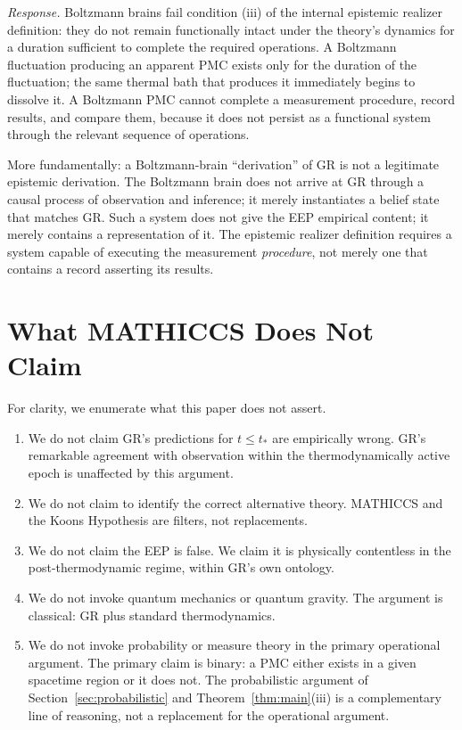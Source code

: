 \documentclass[11pt,a4paper]{article}
\begin{document}
\emph{Response.} Boltzmann brains fail condition (iii) of the internal epistemic
realizer definition: they do not remain functionally intact under the theory's dynamics
for a duration sufficient to complete the required operations. A Boltzmann fluctuation
producing an apparent PMC exists only for the duration of the fluctuation; the same
thermal bath that produces it immediately begins to dissolve it. A Boltzmann PMC
cannot complete a measurement procedure, record results, and compare them, because it
does not persist as a functional system through the relevant sequence of operations.

More fundamentally: a Boltzmann-brain ``derivation'' of GR is not a legitimate
epistemic derivation. The Boltzmann brain does not arrive at GR through a causal
process of observation and inference; it merely instantiates a belief state that
matches GR. Such a system does not give the EEP empirical content; it merely contains
a representation of it. The epistemic realizer definition requires a system capable of
executing the measurement \emph{procedure}, not merely one that contains a record
asserting its results.

\section{What MATHICCS Does Not Claim}
\label{sec:limits}

For clarity, we enumerate what this paper does not assert.

\begin{enumerate}
\item We do not claim GR's predictions for $t \leq t_*$ are empirically wrong. GR's
remarkable agreement with observation within the thermodynamically active epoch is
unaffected by this argument.

\item We do not claim to identify the correct alternative theory. MATHICCS and the
Koons Hypothesis are filters, not replacements.

\item We do not claim the EEP is false. We claim it is physically contentless in
the post-thermodynamic regime, within GR's own ontology.

\item We do not invoke quantum mechanics or quantum gravity. The argument is classical:
GR plus standard thermodynamics.

\item We do not invoke probability or measure theory in the primary operational
argument. The primary claim is binary: a PMC either exists in a given spacetime region
or it does not. The probabilistic argument of Section~\ref{sec:probabilistic} and
Theorem~\ref{thm:main}(iii) is a complementary line of reasoning, not a replacement
for the operational argument.
\end{enumerate}
\end{document}
